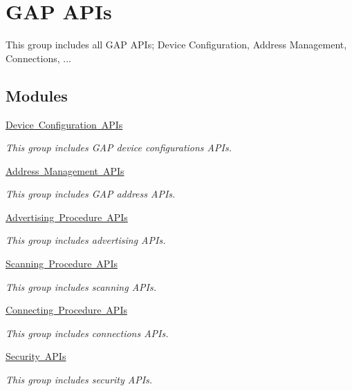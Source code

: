 \hypertarget{group__gap__group}{}\section{G\+AP A\+P\+Is}
\label{group__gap__group}


This group includes all G\+AP A\+P\+Is; Device Configuration, Address Management, Connections, ...  


\subsection*{Modules}
\begin{DoxyCompactItemize}
\item 
\mbox{\hyperlink{group__gap__dev__config__group}{Device Configuration A\+P\+Is}}
\begin{DoxyCompactList}\small\item\em This group includes G\+AP device configurations A\+P\+Is. \end{DoxyCompactList}\item 
\mbox{\hyperlink{group__gap__addr__mgmt__group}{Address Management A\+P\+Is}}
\begin{DoxyCompactList}\small\item\em This group includes G\+AP address A\+P\+Is. \end{DoxyCompactList}\item 
\mbox{\hyperlink{group__gap__adv__group}{Advertising Procedure A\+P\+Is}}
\begin{DoxyCompactList}\small\item\em This group includes advertising A\+P\+Is. \end{DoxyCompactList}\item 
\mbox{\hyperlink{group__gap__scan__group}{Scanning Procedure A\+P\+Is}}
\begin{DoxyCompactList}\small\item\em This group includes scanning A\+P\+Is. \end{DoxyCompactList}\item 
\mbox{\hyperlink{group__gap__conn__group}{Connecting Procedure A\+P\+Is}}
\begin{DoxyCompactList}\small\item\em This group includes connections A\+P\+Is. \end{DoxyCompactList}\item 
\mbox{\hyperlink{group__gap__sec__group}{Security A\+P\+Is}}
\begin{DoxyCompactList}\small\item\em This group includes security A\+P\+Is. \end{DoxyCompactList}\item 

\end{DoxyCompactItemize}
